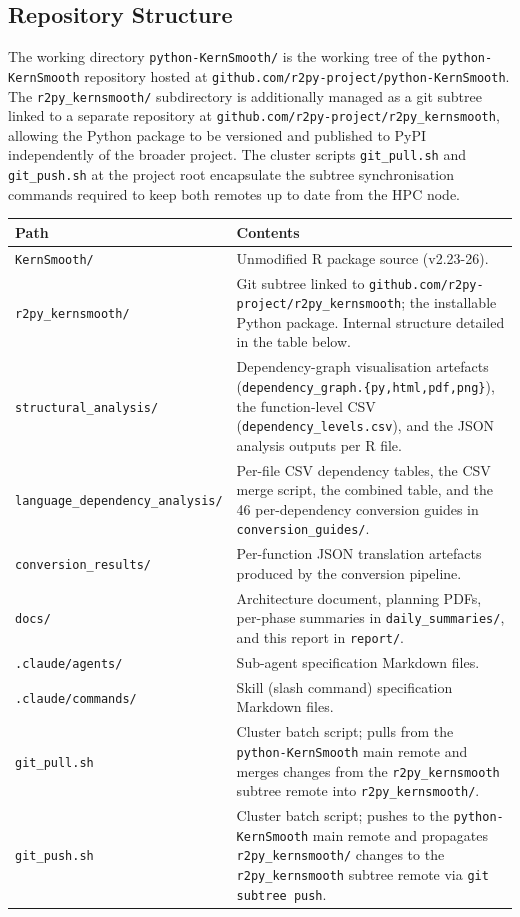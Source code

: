 \documentclass[12pt,a4paper]{article}
\begin{document}
\subsection{Repository Structure}

The working directory \texttt{python-KernSmooth/} is the working tree of the \texttt{python-KernSmooth} repository hosted at \texttt{github.com/r2py-project/python-KernSmooth}. The \texttt{r2py\_kernsmooth/} subdirectory is additionally managed as a git subtree linked to a separate repository at \texttt{github.com/r2py-project/r2py\_kernsmooth}, allowing the Python package to be versioned and published to PyPI independently of the broader project. The cluster scripts \texttt{git\_pull.sh} and \texttt{git\_push.sh} at the project root encapsulate the subtree synchronisation commands required to keep both remotes up to date from the HPC node.

\begin{center}
\begin{tabular}{p{}p{}}
\toprule
Path & Contents \\
\midrule
\texttt{KernSmooth/} &
  Unmodified R package source (v2.23-26). \\
\texttt{r2py\_kernsmooth/} &
  Git subtree linked to \texttt{github.com/r2py-project/r2py\_kernsmooth}; the installable Python package. Internal structure detailed in the table below. \\
\texttt{structural\_analysis/} &
  Dependency-graph visualisation artefacts (\texttt{dependency\_graph.\{py,html,pdf,png\}}), the function-level CSV (\texttt{dependency\_levels.csv}), and the JSON analysis outputs per R file. \\
\texttt{language\_dependency\_analysis/} &
  Per-file CSV dependency tables, the CSV merge script, the combined table, and the 46 per-dependency conversion guides in \texttt{conversion\_guides/}. \\
\texttt{conversion\_results/} &
  Per-function JSON translation artefacts produced by the conversion pipeline. \\
\texttt{docs/} &
  Architecture document, planning PDFs, per-phase summaries in \texttt{daily\_summaries/}, and this report in \texttt{report/}. \\
\texttt{.claude/agents/} &
  Sub-agent specification Markdown files. \\
\texttt{.claude/commands/} &
  Skill (slash command) specification Markdown files. \\
\texttt{git\_pull.sh} &
  Cluster batch script; pulls from the \texttt{python-KernSmooth} main remote and merges changes from the \texttt{r2py\_kernsmooth} subtree remote into \texttt{r2py\_kernsmooth/}. \\
\texttt{git\_push.sh} &
  Cluster batch script; pushes to the \texttt{python-KernSmooth} main remote and propagates \texttt{r2py\_kernsmooth/} changes to the \texttt{r2py\_kernsmooth} subtree remote via \texttt{git subtree push}. \\
\bottomrule
\end{tabular}
\end{center}
\end{document}
